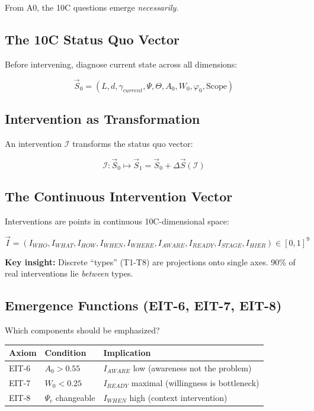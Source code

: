 From A0, the 10C questions emerge \textit{necessarily}.

\subsection{The 10C Status Quo Vector}

Before intervening, diagnose current state across all dimensions:

\begin{equation}
\boxed{
\vec{S}_0 = (L, d, \gamma_{current}, \Psi, \Theta, A_0, W_0, \varphi_0, \text{Scope})
}
\label{eq:mp-status-quo}
\end{equation}

\subsection{Intervention as Transformation}

An intervention $\mathcal{I}$ transforms the status quo vector:

\begin{equation}
\boxed{
\mathcal{I}: \vec{S}_0 \mapsto \vec{S}_1 = \vec{S}_0 + \Delta\vec{S}(\mathcal{I})
}
\label{eq:mp-intervention-transform}
\end{equation}

\subsection{The Continuous Intervention Vector}

Interventions are points in continuous 10C-dimensional space:

\begin{equation}
\boxed{
\vec{I} = (I_{WHO}, I_{WHAT}, I_{HOW}, I_{WHEN}, I_{WHERE}, I_{AWARE}, I_{READY}, I_{STAGE}, I_{HIER}) \in [0,1]^9
}
\label{eq:mp-intervention-vector}
\end{equation}

\textbf{Key insight:} Discrete ``types'' (T1-T8) are projections onto single axes. 90\% of real interventions lie \textit{between} types.

\subsection{Emergence Functions (EIT-6, EIT-7, EIT-8)}

Which components should be emphasized?

\begin{center}
\renewcommand{\arraystretch}{1.2}
\begin{tabular}{@{}lll@{}}
\toprule
\textbf{Axiom} & \textbf{Condition} & \textbf{Implication} \\
\midrule
EIT-6 & $A_0 > 0.55$ & $I_{AWARE}$ low (awareness not the problem) \\
EIT-7 & $W_0 < 0.25$ & $I_{READY}$ maximal (willingness is bottleneck) \\
EIT-8 & $\Psi_c$ changeable & $I_{WHEN}$ high (context intervention) \\
\bottomrule
\end{tabular}
\end{center}

